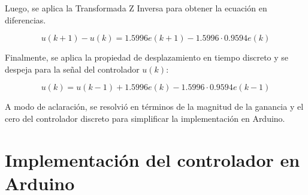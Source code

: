 Luego, se aplica la Transformada Z Inversa para obtener la ecuación en diferencias.

\begin{equation}
    u(k+1) - u(k) = 1.5996 e(k+1) - 1.5996 \cdot 0.9594 e(k)
\end{equation}

Finalmente, se aplica la propiedad de desplazamiento en tiempo discreto y se despeja para la señal del controlador $u(k)$:

\begin{equation}
    u(k) = u(k-1) + 1.5996 e(k) - 1.5996 \cdot 0.9594 e(k-1)
\end{equation}

A modo de aclaración, se resolvió en términos de la magnitud de la ganancia y el cero del controlador discreto para simplificar la implementación en Arduino.

\section{Implementación del controlador en Arduino} \label{anexoD}


